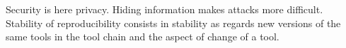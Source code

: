 \documentclass[a4paper, english]{article}%
\newcommand{\lualatex}{\texttt{lualatex}}
\begin{document}

Security is here privacy. 
Hiding information makes attacks more difficult. 
Stability of reproducibility consists in stability as regards new versions of the same tools 
in the tool chain and the aspect of change of a tool. 
\end{document}
